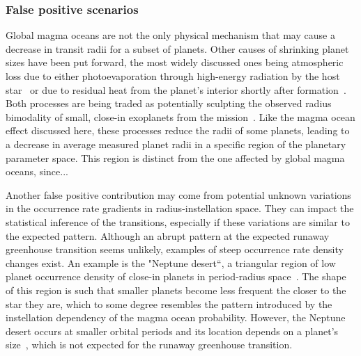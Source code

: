\documentclass[twocolumn]{aastex631}
\begin{document}
\subsubsection{False positive scenarios}
\begin{note}
    Global magma oceans are not the only physical mechanism that may cause a decrease in transit radii for a subset of planets.
    Other causes of shrinking planet sizes have been put forward, the most widely discussed ones being atmospheric loss due to either photoevaporation through high-energy radiation by the host star~\citep[e.g.,][]{Owen2013,Jin2014,Mordasini2020a} or due to residual heat from the planet's interior shortly after formation~\citep{Ginzburg2016b,Ginzburg2018,Gupta2019}.
    Both processes are being traded as potentially sculpting the observed radius bimodality of small, close-in exoplanets from the  mission~\citep{Fulton2017,VanEylen2018}.
    Like the magma ocean effect discussed here, these processes reduce the radii of some planets, leading to a decrease in average measured planet radii in a specific region of the planetary parameter space.
    This region is distinct from the one affected by global magma oceans, since... 

    Another false positive contribution may come from potential unknown variations in the occurrence rate gradients in radius-instellation space.
    They can impact the statistical inference of the transitions, especially if these variations are similar to the expected pattern.
    Although an abrupt pattern at the expected runaway greenhouse transition seems unlikely, examples of steep occurrence rate density changes exist.
    An example is the "Neptune desert``, a triangular region of low planet occurrence density of close-in planets in period-radius space~\citep{Szabo2011,Mazeh2016,Dreizler2020b}.
    The shape of this region is such that smaller planets become less frequent the closer to the star they are, which to some degree resembles the pattern introduced by the instellation dependency of the magma ocean probability.
    However, the Neptune desert occurs at smaller orbital periods and its location depends on a planet's size~\citep{Szabo2011}, which is not expected for the runaway greenhouse transition.
\end{note}

\end{document}

